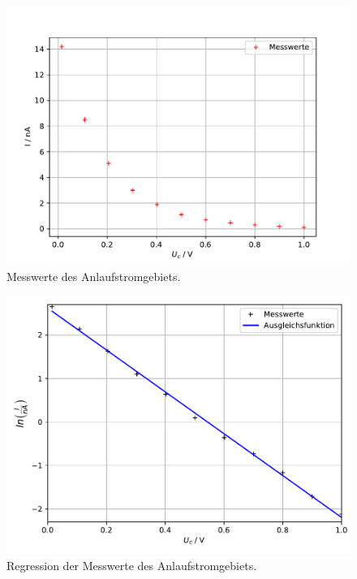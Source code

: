 \begin{figure}[H]
    \centering
    \includegraphics[scale=0.7]{Auswertung/c_Messwerte.pdf}
    \caption{Messwerte des Anlaufstromgebiets.}
    \label{fig:Anlauf_Mess}
\end{figure}
\begin{figure}[H]
    \centering
    \includegraphics[scale=0.7]{Auswertung/c_Regression.pdf}
    \caption{Regression der Messwerte des Anlaufstromgebiets.}
    \label{fig:Anlauf_Regress}
\end{figure}

